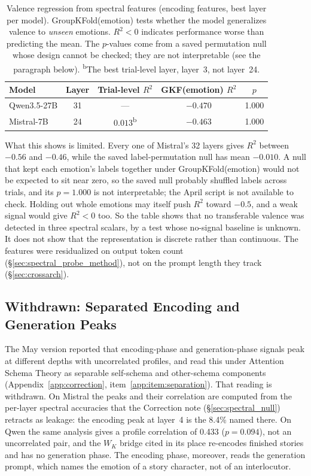 \begin{table}[H]
\centering
\caption{Valence regression from spectral features (encoding features, best layer per model). GroupKFold(emotion) tests whether the model generalizes valence to \emph{unseen} emotions. $R^2 < 0$ indicates performance worse than predicting the mean. The $p$-values come from a saved permutation null whose design cannot be checked; they are not interpretable (see the paragraph below). \textsuperscript{b}The best trial-level layer, layer~3, not layer~24.}
\label{tab:regression}
\begin{tabular}{lcccc}
\toprule
\textbf{Model} & \textbf{Layer} & \textbf{Trial-level $R^2$} & \textbf{GKF(emotion) $R^2$} & \textbf{$p$} \\
\midrule
Qwen3.5-27B & 31 & --- & $-0.470$ & 1.000 \\
Mistral-7B & 24 & $0.013$\textsuperscript{b} & $-0.463$ & 1.000 \\
\bottomrule
\end{tabular}
\end{table}

What this shows is limited. Every one of Mistral's 32 layers gives $R^2$ between $-0.56$ and $-0.46$, while the saved label-permutation null has mean $-0.010$. A null that kept each emotion's labels together under GroupKFold(emotion) would not be expected to sit near zero, so the saved null probably shuffled labels across trials, and its $p = 1.000$ is not interpretable; the April script is not available to check. Holding out whole emotions may itself push $R^2$ toward $-0.5$, and a weak signal would give $R^2 < 0$ too. So the table shows that no transferable valence was detected in three spectral scalars, by a test whose no-signal baseline is unknown. It does not show that the representation is discrete rather than continuous. The features were residualized on output token count (\S\ref{sec:spectral_probe_method}), not on the prompt length they track (\S\ref{sec:crossarch}).

\subsection{Withdrawn: Separated Encoding and Generation Peaks}
\label{sec:separation}

The May version reported that encoding-phase and generation-phase signals peak at different depths with uncorrelated profiles, and read this under Attention Schema Theory as separable self-schema and other-schema components (Appendix~\ref{app:correction}, item~\ref{app:item:separation}). That reading is withdrawn. On Mistral the peaks and their correlation are computed from the per-layer spectral accuracies that the Correction note (\S\ref{sec:spectral_null}) retracts as leakage: the encoding peak at layer~4 is the 8.4\% named there. On Qwen the same analysis gives a profile correlation of 0.433 ($p = 0.094$), not an uncorrelated pair, and the $W_K$ bridge cited in its place re-encodes finished stories and has no generation phase. The encoding phase, moreover, reads the generation prompt, which names the emotion of a story character, not of an interlocutor.

